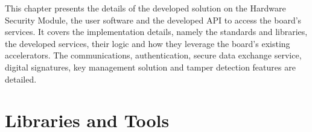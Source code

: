 \cleardoublepage
\label{chap:implementation}

This chapter presents the details of the developed solution on the Hardware Security Module, the user software and the developed API to access the board's services.
It covers the implementation details, namely the standards and libraries, the developed services, their logic and how they leverage the board's existing accelerators. The communications, authentication, secure data exchange service, digital signatures, key management solution and tamper detection features are detailed.

\section{Libraries and Tools}\label{chap:implementation:tools}


